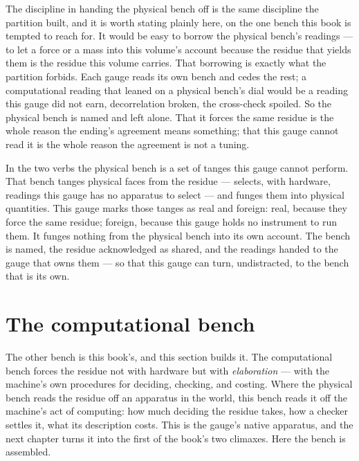 The discipline in handing the physical bench off is the same discipline the partition built, and it is worth stating
plainly here, on the one bench this book is tempted to reach for. It would be easy to borrow the physical bench's
readings --- to let a force or a mass into this volume's account because the residue that yields them is the residue this
volume carries. That borrowing is exactly what the partition forbids. Each gauge reads its own bench and cedes the rest;
a computational reading that leaned on a physical bench's dial would be a reading this gauge did not earn, decorrelation
broken, the cross-check spoiled. So the physical bench is named and left alone. That it forces the same residue is the
whole reason the ending's agreement means something; that this gauge cannot read it is the whole reason the agreement is
not a tuning.

In the two verbs the physical bench is a set of tanges this gauge cannot perform. That bench tanges physical faces from
the residue --- selects, with hardware, readings this gauge has no apparatus to select --- and funges them into physical
quantities. This gauge marks those tanges as real and foreign: real, because they force the same residue; foreign,
because this gauge holds no instrument to run them. It funges nothing from the physical bench into its own account. The
bench is named, the residue acknowledged as shared, and the readings handed to the gauge that owns them --- so that this
gauge can turn, undistracted, to the bench that is its own.

\section{The computational bench}

The other bench is this book's, and this section builds it. The computational bench forces the residue not with hardware
but with \emph{elaboration} --- with the machine's own procedures for deciding, checking, and costing. Where the physical
bench reads the residue off an apparatus in the world, this bench reads it off the machine's act of computing: how much
deciding the residue takes, how a checker settles it, what its description costs. This is the gauge's native apparatus,
and the next chapter turns it into the first of the book's two climaxes. Here the bench is assembled.

